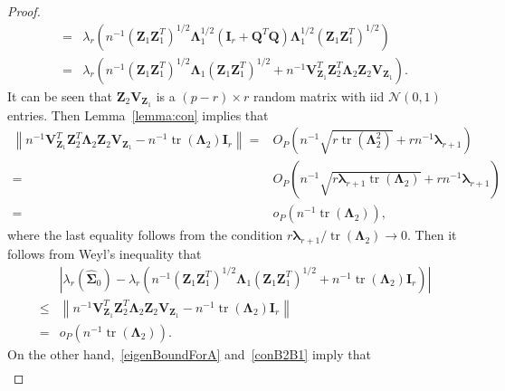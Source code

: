 \documentclass[12pt]{article} %
\DeclareMathOperator{\mytr}{tr}
\newcommand{\bQ}{\mathbf{Q}}
\newcommand{\bZ}{\mathbf{Z}}
\newcommand{\bI}{\mathbf{I}}
\newcommand{\bV}{\mathbf{V}}
\newcommand{\bfsym}[1]{\ensuremath{\boldsymbol{#1}}}
\def\blambda {\bfsym {\lambda}}
\def\bLambda {\bfsym {\Lambda}}
\def\bSigma {\bfsym {\Sigma}}
\theoremstyle{definition}
\begin{document}
\begin{appendices}
\begin{proof}
\begin{equation*}
\begin{split}
     =&\lambda_r\left(
n^{-1}
  (\bZ_1\bZ_1^T)^{1/2}\bLambda_1^{1/2}(\bI_r +\bQ^T \bQ)\bLambda_1^{1/2} (\bZ_1\bZ_1^T)^{1/2}
     \right)
     \\
     =&
     \lambda_r\left(
        n^{-1} (\bZ_1\bZ_1^T)^{1/2}
         \bLambda_1 
         (\bZ_1\bZ_1^T)^{1/2}
         +
         n^{-1} \bV_{\bZ_1}^T \bZ_2^T \bLambda_2 \bZ_2 \bV_{\bZ_1} 
    \right).
    \end{split}
\end{equation*}
It can be seen that $\bZ_2 \bV_{\bZ_1}$ is a $(p-r)\times r$ random matrix with iid $\mathcal{N}(0,1)$ entries.
Then Lemma~\ref{lemma:con} implies that
\begin{equation}\label{projCon}
        \begin{split}
        \left\|n^{-1}  \bV_{\bZ_1}^T \bZ_2^T \bLambda_2 \bZ_2 \bV_{\bZ_1} 
        -n^{-1} \mytr(\bLambda_2) \bI_r
        \right\|
        =&
        O_P\left(
            n^{-1}\sqrt{r\mytr\left(\bLambda_2^2\right)}
            +rn^{-1}\blambda_{r+1}
        \right)
        \\
        =&
        O_P\left(
            n^{-1}\sqrt{r\blambda_{r+1}\mytr\left(\bLambda_2\right)}
            +rn^{-1}\blambda_{r+1}
        \right)
        \\
        =&o_P\left(n^{-1}\mytr(\bLambda_2)\right)
        ,
        \end{split}
    \end{equation}
    where the last equality follows from the condition $r\blambda_{r+1} /\mytr(\bLambda_2)\to 0$.
    Then it follows from Weyl's inequality that 
    \begin{equation*}
        \begin{split}
        &\left| 
        \lambda_r (\hat{\bSigma}_0)-
     \lambda_r\left(
        n^{-1} (\bZ_1\bZ_1^T)^{1/2}
         \bLambda_1 
         (\bZ_1\bZ_1^T)^{1/2}
         +
         n^{-1} \mytr(\bLambda_2)\bI_r 
    \right)
    \right|
\\
\leq &\left\|n^{-1} \bV_{\bZ_1}^T \bZ_2^T \bLambda_2 \bZ_2 \bV_{\bZ_1} 
        -n^{-1} \mytr(\bLambda_2) \bI_r
        \right\|
        \\
        =&o_P\left(n^{-1}\mytr(\bLambda_2)\right).
        \end{split}
    \end{equation*}
    On the other hand,~\eqref{eigenBoundForA} and~\eqref{conB2B1} imply that
    \begin{equation*}
        \begin{split}
        &

\end{split}
\end{equation*}
\end{proof}
\end{appendices}
\end{document}
